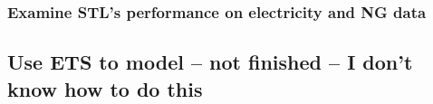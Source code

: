 \documentclass[
]{article}
\newenvironment{Shaded}{\begin{snugshade}}{\end{snugshade}}
\newcommand{\AttributeTok}[1]{\textcolor[rgb]{0.77,0.63,0.00}{#1}}
\newcommand{\CommentTok}[1]{\textcolor[rgb]{0.56,0.35,0.01}{\textit{#1}}}
\newcommand{\DecValTok}[1]{\textcolor[rgb]{0.00,0.00,0.81}{#1}}
\newcommand{\FunctionTok}[1]{\textcolor[rgb]{0.00,0.00,0.00}{#1}}
\newcommand{\NormalTok}[1]{#1}
\newcommand{\OtherTok}[1]{\textcolor[rgb]{0.56,0.35,0.01}{#1}}
\newcommand{\SpecialCharTok}[1]{\textcolor[rgb]{0.00,0.00,0.00}{#1}}
\begin{document}
\hypertarget{examine-stls-performance-on-electricity-and-ng-data}{%
\subsubsection{Examine STL's performance on electricity and NG
data}\label{examine-stls-performance-on-electricity-and-ng-data}}

\begin{Shaded}
\end{Shaded}

\hypertarget{use-ets-to-model-not-finished-i-dont-know-how-to-do-this}{%
\subsection{Use ETS to model -- not finished -- I don't know how to do
this}\label{use-ets-to-model-not-finished-i-dont-know-how-to-do-this}}
\end{document}
